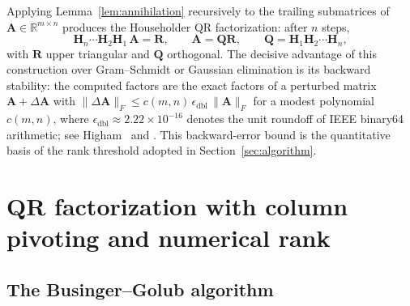 \documentclass[11pt,a4paper]{article}
\theoremstyle{definition}
\newcommand{\R}{\mathbb{R}}
\newcommand{\eps}{\epsilon_{\mathrm{dbl}}}
\newcommand{\normF}[1]{\|#1\|_{F}}
\begin{document}
Applying Lemma~\ref{lem:annihilation} recursively to the trailing
submatrices of $\bm A\in\R^{m\times n}$ produces the Householder QR
factorization: after $n$ steps,
\begin{equation}
  \bm H_{n}\cdots\bm H_{2}\bm H_{1}\,\bm A=\bm R,
  \qquad
  \bm A=\bm Q\bm R,
  \qquad
  \bm Q=\bm H_{1}\bm H_{2}\cdots\bm H_{n},
\end{equation}
with $\bm R$ upper triangular and $\bm Q$ orthogonal. The decisive
advantage of this construction over Gram--Schmidt or Gaussian
elimination is its backward stability: the computed factors are the
exact factors of a perturbed matrix $\bm A+\Delta\bm A$ with
$\normF{\Delta\bm A}\le c(m,n)\,\eps\,\normF{\bm A}$ for a modest
polynomial $c(m,n)$, where $\eps\approx2.22\times10^{-16}$ denotes the
unit roundoff of IEEE binary64 arithmetic; see
Higham~\cite[Thm.~19.4]{higham2002} and
\cite[\S5.1.9]{golubvanloan2013}. This backward-error bound is the
quantitative basis of the rank threshold adopted in
Section~\ref{sec:algorithm}.

\section{QR factorization with column pivoting and numerical rank}
\label{sec:qrcp}

\subsection{The Businger--Golub algorithm}
\end{document}
